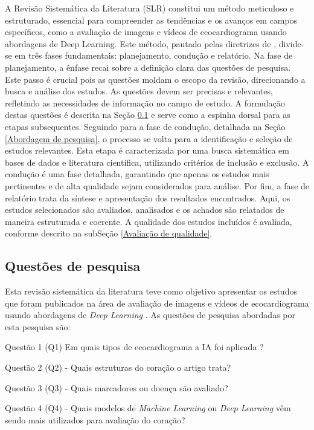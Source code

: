 A Revisão Sistemática da Literatura (SLR) constitui um método meticuloso e estruturado, essencial para compreender as tendências e os avanços em campos específicos, como a avaliação de imagens e vídeos de ecocardiograma usando abordagens de Deep Learning. Este método, pautado pelas diretrizes de \textcite{kitchenham2009systematic}, divide-se em três fases fundamentais: planejamento, condução e relatório. Na fase de planejamento, a ênfase recai sobre a definição clara das questões de pesquisa. Este passo é crucial pois as questões moldam o escopo da revisão, direcionando a busca e análise dos estudos. As questões devem ser precisas e relevantes, refletindo as necessidades de informação no campo de estudo. A formulação destas questões é descrita na Seção \ref{Questões de pesquisa} e serve como a espinha dorsal para as etapas subsequentes. Seguindo para a fase de condução, detalhada na Seção \ref{Abordagem de pesquisa}, o processo se volta para a identificação e seleção de estudos relevantes. Esta etapa é caracterizada por uma busca sistemática em bases de dados e literatura científica, utilizando critérios de inclusão e exclusão. A condução é uma fase detalhada, garantindo que apenas os estudos mais pertinentes e de alta qualidade sejam considerados para análise. Por fim, a fase de relatório trata da síntese e apresentação dos resultados encontrados. Aqui, os estudos selecionados são avaliados, analisados e os achados são relatados de maneira estruturada e coerente. A qualidade dos estudos incluídos é avaliada, conforme descrito na subSeção \ref{Avaliação de qualidade}.

\subsection{Questões de pesquisa}
\label{Questões de pesquisa}

Esta revisão sistemática da literatura teve como objetivo apresentar os estudos que foram publicados na área de avaliação de imagens e vídeos de ecocardiograma  usando abordagens de \textit{Deep Learning} . As questões de pesquisa abordadas por esta pesquisa são:

Questão 1 (Q1) Em quais tipos de ecocardiograma a IA foi aplicada ?

Questão 2 (Q2) - Quais estruturas do coração o artigo trata?

Questão 3 (Q3) - Quais marcadores ou doença são avaliado?

Questão 4 (Q4) - Quais modelos de \textit{Machine Learning}  ou \textit{Deep Learning}  vêm sendo mais utilizados para avaliação do coração?


